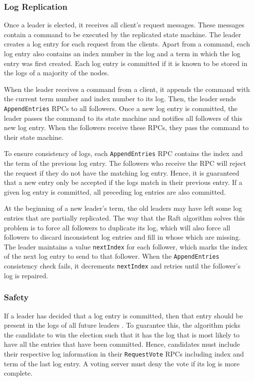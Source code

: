 \documentclass[12pt, a4paper]{article}
\begin{document}
  \subsubsection{Log Replication}
  Once a leader is elected, it receives all client's request messages. These messages contain a command to be executed by the replicated state machine. The leader creates a log entry for each request from the clients. Apart from a command, each log entry also contains an index number in the log and a term in which the log entry was first created. Each log entry is committed if it is known to be stored in the logs of a majority of the nodes.

  When the leader receives a command from a client, it appends the command with the current term number and index number to its log. Then, the leader sends \texttt{AppendEntries} RPCs to all followers. Once a new log entry is committed, the leader passes the command to its state machine and notifies all followers of this new log entry. When the followers receive these RPCs, they pass the command to their state machine.

  To ensure consistency of logs, each \texttt{AppendEntries} RPC contains the index and the term of the previous log entry. The followers who receive the RPC will reject the request if they do not have the matching log entry. Hence, it is guaranteed that a new entry only be accepted if the logs match in their previous entry. If a given log entry is committed, all preceding log entries are also committed.

  At the beginning of a new leader's term, the old leaders may have left some log entries that are partially replicated. The way that the Raft algorithm solves this problem is to force all followers to duplicate its log, which will also force all followers to discard inconsistent log entries and fill in whose which are missing. The leader maintains a value \texttt{nextIndex} for each follower, which marks the index of the next log entry to send to that follower. When the \texttt{AppendEntries} consistency check fails, it decrements \texttt{nextIndex} and retries until the follower's log is repaired.

  \subsubsection{Safety}
  If a leader has decided that a log entry is committed, then that entry should be present in the logs of all future leaders \cite{conf/usenix/OngaroO14}. To guarantee this, the algorithm picks the candidate to win the election such that it has the log that is most likely to have all the entries that have been committed. Hence, candidates must include their respective log information in their \texttt{RequestVote} RPCs including index and term of the last log entry. A voting server must deny the vote if its log is more complete.
\end{document}
